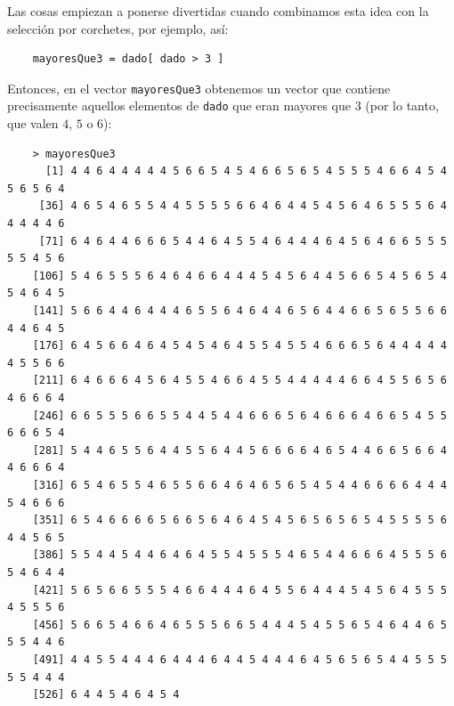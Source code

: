 \documentclass[10pt,a4paper]{article}\usepackage[]{graphicx}\usepackage[]{color}
\newcounter {cont01}
\begin{document}
Las cosas empiezan a ponerse divertidas cuando combinamos esta idea con la selección por corchetes, por ejemplo, así:
\begin{verbatim}
    mayoresQue3 = dado[ dado > 3 ]
\end{verbatim}
Entonces, en el vector {\tt mayoresQue3} obtenemos un vector que contiene precisamente aquellos elementos de {\tt dado} que eran mayores que 3 (por lo tanto, que valen $4$, $5$ o $6$):
\begin{verbatim}
    > mayoresQue3
      [1] 4 4 6 4 4 4 4 4 5 6 6 5 4 5 4 6 6 5 6 5 4 5 5 5 4 6 6 4 5 4 5 6 5 6 4
     [36] 4 6 5 4 6 5 5 4 4 5 5 5 5 6 6 4 6 4 4 5 4 5 6 4 6 5 5 5 6 4 4 4 4 4 6
     [71] 6 4 6 4 4 6 6 6 5 4 4 6 4 5 5 4 6 4 4 4 6 4 5 6 4 6 6 5 5 5 5 5 4 5 6
    [106] 5 4 6 5 5 5 6 4 6 4 6 6 4 4 4 5 4 5 6 4 4 5 6 6 5 4 5 6 5 4 5 4 6 4 5
    [141] 5 6 6 4 4 6 4 4 4 6 5 5 6 4 6 4 4 6 5 6 4 4 6 6 5 6 5 5 6 6 4 4 6 4 5
    [176] 6 4 5 6 6 4 6 4 5 4 5 4 6 4 5 5 4 5 5 4 6 6 6 5 6 4 4 4 4 4 4 5 5 6 6
    [211] 6 4 6 6 6 4 5 6 4 5 5 4 6 6 4 5 5 4 4 4 4 4 6 6 4 5 5 6 5 6 4 6 6 6 4
    [246] 6 6 5 5 5 6 6 5 5 4 4 5 4 4 6 6 6 5 6 4 6 6 6 4 6 6 5 4 5 5 6 6 6 5 4
    [281] 5 4 4 6 5 5 6 4 4 5 5 6 4 4 5 6 6 6 6 4 6 5 4 4 6 6 5 6 6 4 4 6 6 6 4
    [316] 6 5 4 6 5 5 4 6 5 5 6 6 4 6 4 6 5 6 5 4 5 4 4 6 6 6 6 4 4 4 5 4 6 6 6
    [351] 6 5 4 6 6 6 6 5 6 6 5 6 4 6 4 5 4 5 6 5 6 5 6 5 4 5 5 5 5 6 4 4 5 6 5
    [386] 5 5 4 4 5 4 4 6 4 6 4 5 5 4 5 5 5 4 6 5 4 4 6 6 6 4 5 5 5 6 5 4 6 4 4
    [421] 5 6 5 6 6 5 5 5 4 6 6 4 4 4 6 4 5 5 6 4 4 4 5 4 5 6 4 5 5 5 4 5 5 5 6
    [456] 5 6 6 5 4 6 6 4 6 5 5 5 6 6 5 4 4 4 5 4 5 5 6 5 4 6 4 4 6 5 5 5 4 4 6
    [491] 4 4 5 5 4 4 4 6 4 4 4 6 4 4 5 4 4 4 6 4 5 6 5 6 5 4 4 5 5 5 5 5 4 4 4
    [526] 6 4 4 5 4 6 4 5 4
\end{verbatim}
\end{document}
